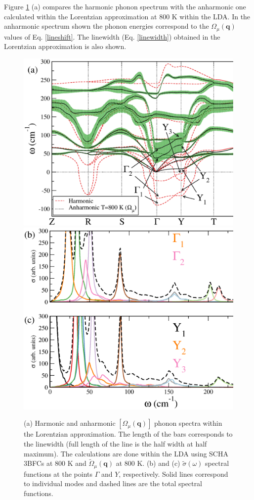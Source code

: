 Figure \ref{lw-sns} (a) compares the harmonic phonon spectrum with the anharmonic one calculated within the Lorentzian approximation at $800$ K within the LDA. In the anharmonic spectrum shown the phonon energies correspond to
the $\Omega_{\mu}(\mathbf{q})$ values of Eq. \ref{lineshift}. The linewidth (Eq. \ref{linewidth}) obtained in the Lorentzian approximation is also shown.
\begin{figure}[h]
\begin{center}
\includegraphics[width=0.7\linewidth]{Figures/phonon-sns.eps}
\includegraphics[width=0.7\linewidth]{Figures/spf-sns.eps}
\caption[Phonons within the Lorentzian approximation in SnS.]{(a) Harmonic and anharmonic $[\Omega_{\mu}(\mathbf{q})]$ phonon spectra within the Lorentzian approximation. The length of the bars corresponds to the linewidth (full 
length of the line is the half width at half maximum). The calculations are done within the LDA using SCHA 3BFCs at $800$ K and $\tilde{\Omega}_{\mu}(\mathbf{q})$ at $800$ K. (b) and (c) $\tilde{\sigma}(\omega)$ spectral functions at 
the points $\Gamma$ and $Y$, respectively. Solid lines correspond to individual modes and dashed lines are the total spectral functions.}
\label{lw-sns}
\end{center}
\end{figure}
